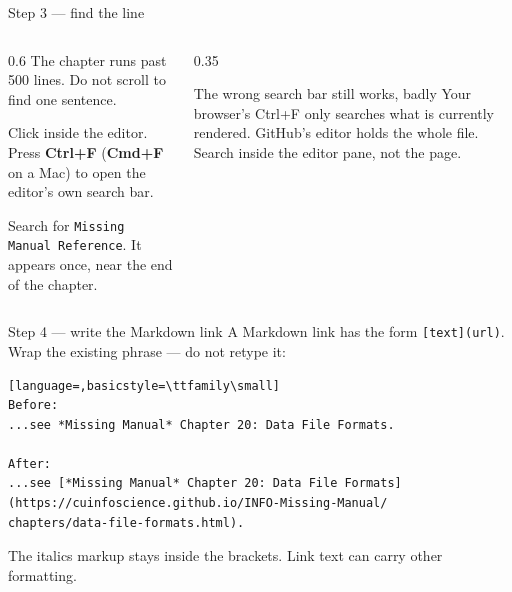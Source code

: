 \documentclass[9pt,aspectratio=169]{beamer}
\begin{document}
\begin{frame}{Step 3 --- find the line}
    \begin{columns}[T]
        \begin{column}{0.6\textwidth}
            The chapter runs past 500 lines. Do not scroll to find one sentence.

            \medskip
            Click inside the editor. Press \textbf{Ctrl+F} (\textbf{Cmd+F} on a Mac) to open the editor's own search bar.

            \medskip
            Search for \texttt{Missing Manual Reference}. It appears once, near the end of the chapter.
        \end{column}
        \begin{column}{0.35\textwidth}
            \begin{alertblock}{The wrong search bar still works, badly}
                \footnotesize Your browser's Ctrl+F only searches what is currently rendered. GitHub's editor holds the whole file. Search inside the editor pane, not the page.
            \end{alertblock}
        \end{column}
    \end{columns}
\end{frame}

\begin{frame}[fragile]{Step 4 --- write the Markdown link}
    A Markdown link has the form \texttt{[text](url)}. Wrap the existing phrase --- do not retype it:
\begin{lstlisting}[language=,basicstyle=\ttfamily\small]
Before:
...see *Missing Manual* Chapter 20: Data File Formats.

After:
...see [*Missing Manual* Chapter 20: Data File Formats]
(https://cuinfoscience.github.io/INFO-Missing-Manual/
chapters/data-file-formats.html).
\end{lstlisting}
    The italics markup stays inside the brackets. Link text can carry other formatting.
\end{frame}
\end{document}
